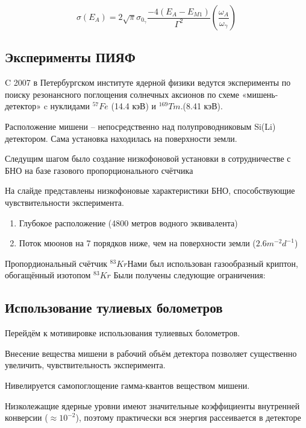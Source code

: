 \documentclass[a4paper,article,14pt]{extarticle}
\begin{document}
\begin{equation}
    \sigma \left( {{E_A}} \right) = 2\sqrt \pi  {\sigma _{{0_\gamma }}}\frac{{ - 4\left( {{E_A} - {E_{M1}}} \right)}}{{{\Gamma ^2}}}\left( {\frac{{{\omega _A}}}{{{\omega _\gamma }}}} \right)
\end{equation}

\subsection{Эксперименты ПИЯФ}
C 2007 в Петербургском институте ядерной физики ведутся эксперименты по поиску резонансного поглощения солнечных аксионов по схеме «мишень-детектор» c нуклидами $^{57}Fe$ (14.4 кэВ) и $^{169}Tm$.(8.41 кэВ).

Расположение мишени -- непосредственно над полупроводниковым Si(Li) детектором. Сама установка находилась на поверхности земли.

Следущим шагом было создание низкофоновой установки в сотрудничестве с БНО на базе газового пропорционального счётчика 

На слайде представлены низкофоновые характеристики БНО, способствующие чувствительности эксперимента.

\begin{enumerate}
    \item Глубокое расположение (4800 метров водного эквивалента)
    \item Поток мюонов на 7 порядков ниже, чем на поверхности земли ($2.6 m^{-2}d^{-1}$)
\end{enumerate}

Пропордиональный счётчик $^{83}Kr$Нами был использован газообразный криптон, обогащённый изотопом $^{83}Kr$ Были получены следующие ограничения:

\subsection{Использование тулиевых болометров}

Перейдём к мотивировке использования тулиеввых болометров.

Внесение вещества мишени в рабочий объём детектора позволяет существенно увеличить, чувствительность эксперимента. 

Нивелируется самопоглощение гамма-квантов веществом мишени.

Низколежащие ядерные уровни имеют значительные коэффициенты внутренней конверсии  ($\approx 10^{-2}$), поэтому практически вся энергия рассеивается в детекторе
\end{document}
